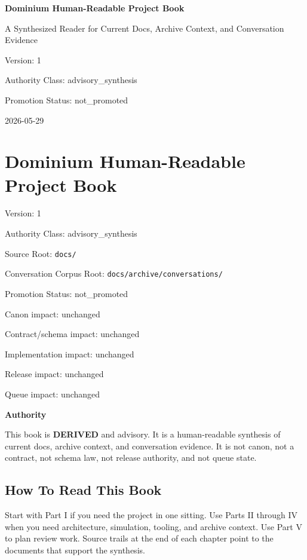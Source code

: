 \documentclass[10.5pt,a4paper,openany]{book}
\newcommand{\vonecallout}[3]{\par\medskip\noindent\begingroup\setlength{\fboxsep}{7pt}\colorbox{DomCalloutBg}{\parbox{0.94\linewidth}{\textbf{\textcolor{#1}{#2}}\par #3}}\endgroup\par\medskip}
\begin{document}
\frontmatter
\begin{titlepage}
\centering
\vspace*{1.8cm}
{\Huge\bfseries Dominium Human-Readable Project Book\par}
\vspace{0.7cm}
{\Large A Synthesized Reader for Current Docs, Archive Context, and Conversation Evidence\par}
\vspace{1.1cm}
{\large Version: 1\par}
{\large Authority Class: advisory\_synthesis\par}
{\large Promotion Status: not\_promoted\par}
\vfill
{\large 2026-05-29\par}
\end{titlepage}
\tableofcontents
\mainmatter
\chapter{Dominium Human-Readable Project Book}

Version: 1

Authority Class: advisory\_\allowbreak{}synthesis

Source Root: \texttt{docs/\allowbreak{}}

Conversation Corpus Root: \texttt{docs/\allowbreak{}archive/\allowbreak{}conversations/\allowbreak{}}

Promotion Status: not\_\allowbreak{}promoted

Canon impact: unchanged

Contract/\allowbreak{}schema impact: unchanged

Implementation impact: unchanged

Release impact: unchanged

Queue impact: unchanged



\vonecallout{DomBlue}{Authority}{This book is \textbf{DERIVED} and advisory.\allowbreak{} It is a human-\allowbreak{}readable synthesis of current docs, archive context, and conversation evidence.\allowbreak{} It is not canon, not a contract, not schema law, not release authority, and not queue state.\allowbreak{}}

\section{How To Read This Book}

Start with Part I if you need the project in one sitting.\allowbreak{} Use Parts II through IV when you need architecture, simulation, tooling, and archive context.\allowbreak{} Use Part V to plan review work.\allowbreak{} Source trails at the end of each chapter point to the documents that support the synthesis.\allowbreak{}
\end{document}
